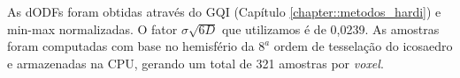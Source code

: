 As dODFs foram obtidas através do GQI \cite{yeh2010} (Capítulo \ref{chapter::metodos_hardi}) e min-max normalizadas. O fator $\sigma \sqrt{6D}$ que utilizamos é de 0,0239. As amostras foram computadas com base no hemisfério da $8^{a}$ ordem de tesselação do icosaedro e armazenadas na CPU, gerando um total de 321 amostras por \textit{voxel}.









